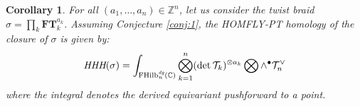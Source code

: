 \documentclass[12pt]{amsart}
\numberwithin{equation}{section}
\newtheorem{corollary}[theorem]{Corollary}
\theoremstyle{definition}
\theoremstyle{remark}
\newcommand{\CC}{\mathbb{C}}
\newcommand{\ZZ}{\mathbb{Z}}
\newcommand{\CB}{\mathcal{B}}
\newcommand{\CT}{\mathcal{T}}
\newcommand{\FT}{\mathbf{FT}}
\renewcommand{\1}{\mathbf{1}}
\newcommand{\FH}{\mathrm{FHilb}}
\newcommand{\edg}{\emph{dg}}
\begin{document}



\begin{corollary}
\label{cor:1}
For all $(a_1,\ldots,a_n) \in \ZZ^n$, let us consider the twist braid
$\sigma=\prod_{k} \FT^{a_k}_k$. Assuming Conjecture \ref{conj:1}, the HOMFLY-PT homology of the closure of $\sigma$ is given by:
\begin{equation}
\label{eqn:hhh twist}
\emph{HHH}(\sigma) = \int_{\FH_n^{\edg}(\CC)} \bigotimes_{k=1}^n(\det \CT_k)^{\otimes a_k}\bigotimes \wedge^{\bullet}\CT_n^{\vee} 
\end{equation}
where the integral denotes the derived equivariant pushforward to a point. 
\end{corollary}


\end{document}
